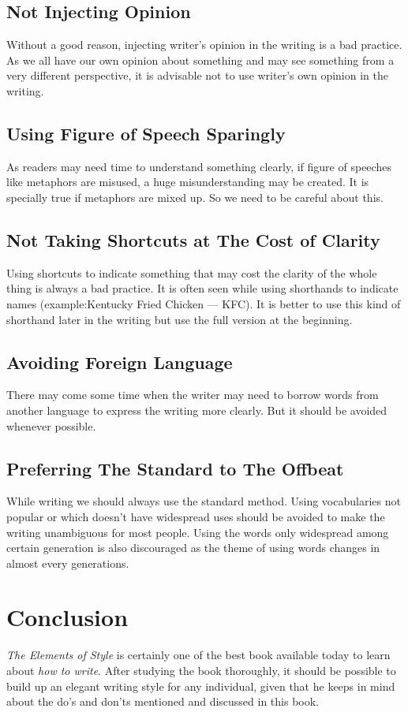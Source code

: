 \documentclass[12pt]{report}
\begin{document}
\section{Not Injecting Opinion}
Without a good reason, injecting writer's opinion in the writing is a bad practice. As we all have our own opinion about something and may see something from a very different perspective, it is advisable not to use writer's own opinion in the writing.


\section{Using Figure of Speech Sparingly}
As readers may need time to understand something clearly, if figure of speeches like metaphors are misused, a huge misunderstanding may be created. It is specially true if metaphors are mixed up. So we need to be careful about this.


\section{Not Taking Shortcuts at The Cost of Clarity}
Using shortcuts to indicate something that may cost the clarity of the whole thing is always a bad practice. It is often seen while using shorthands to indicate names (example:Kentucky Fried Chicken --- KFC). It is better to use this kind of shorthand later in the writing but use the full version at the beginning.


\section{Avoiding Foreign Language}
There may come some time when the writer may need to borrow words from another language to express the writing more clearly. But it should be avoided whenever possible. 


\section{Preferring The Standard to The Offbeat}
While writing we should always use the standard method. Using vocabularies not popular or which doesn't have widespread uses should be avoided to make the writing unambiguous for most people. Using the words only widespread among certain generation is also discouraged as the theme of using words changes in almost every generations.



\chapter{Conclusion}
\textit{The Elements of Style} is certainly one of the best book available today to learn about \textit{how to write}. After studying the book thoroughly, it should be possible to build up an elegant writing style for any individual, given that he keeps in mind about the do's and don'ts mentioned and discussed in this book.
\end{document}
